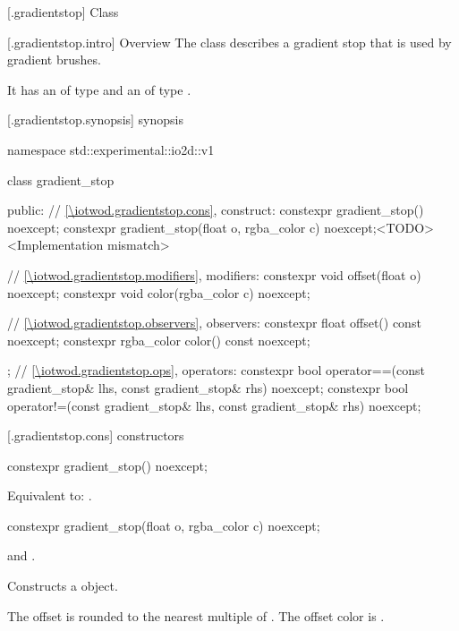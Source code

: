  [\iotwod.gradientstop] {Class }

 [\iotwod.gradientstop.intro] {Overview}
\pnum
{}%
The class  describes a gradient stop that is used by gradient brushes.

\pnum
It has an  of type  and an  of type .

 [\iotwod.gradientstop.synopsis] { synopsis}

\begin{codeblock}
namespace std::experimental::io2d::v1 {
  class gradient_stop {
  public:
    // \ref{\iotwod.gradientstop.cons}, construct:
    constexpr gradient_stop() noexcept;
    constexpr gradient_stop(float o, rgba_color c) noexcept;<TODO><Implementation mismatch>
    
    // \ref{\iotwod.gradientstop.modifiers}, modifiers:
    constexpr void offset(float o) noexcept;
    constexpr void color(rgba_color c) noexcept;
	
    // \ref{\iotwod.gradientstop.observers}, observers:
    constexpr float offset() const noexcept;
    constexpr rgba_color color() const noexcept;
  };
  // \ref{\iotwod.gradientstop.ops}, operators:
  constexpr bool operator==(const gradient_stop& lhs, const gradient_stop& rhs)
    noexcept;
  constexpr bool operator!=(const gradient_stop& lhs, const gradient_stop& rhs)
    noexcept;
}
\end{codeblock}

 [\iotwod.gradientstop.cons] { constructors}

%
\begin{itemdecl}
constexpr gradient_stop() noexcept;
\end{itemdecl}
\begin{itemdescr}
\pnum
\effects
Equivalent to: .
\end{itemdescr}

%
\begin{itemdecl}
constexpr gradient_stop(float o, rgba_color c) noexcept;
\end{itemdecl}
\begin{itemdescr}
\pnum
\requires
{} and .

\pnum
\effects
Constructs a  object.

\pnum
The offset is  rounded to the nearest multiple of . The offset color is .
\end{itemdescr}

